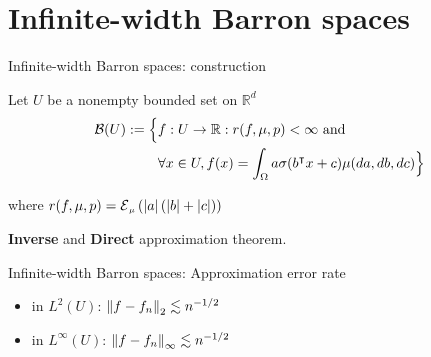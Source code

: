 \documentclass[aspectratio=32]{beamer}
\begin{document}
\section{Infinite-width Barron spaces}
\begin{frame}{Infinite-width Barron spaces: construction}

    Let $U$ be a nonempty bounded set on $\mathbb{R}^d$
    \begin{align*}
        \mathcal{B}(U) := \Big\{
         & f: U \to \mathbb{R}: r(f, \mu, p) < \infty  \textnormal{ and } \\
         & \forall x\in U,
        f(x) = \int_{\Omega} a \sigma(b{}^{\intercal} x + c) \mu(da, db, dc)
        \Big\}
    \end{align*}

    where $r(f, \mu, p) = \ERWi{\mu}{\abs{a} (\abs{b} + \abs{c})}$

    \vspace*{1em}

    \textbf{Inverse} and \textbf{Direct} approximation theorem.
\end{frame}

\begin{frame}{Infinite-width Barron spaces: Approximation error rate}
    \begin{itemize}
        \item in $L^{2}(U)$: $\left\| f - f_n \right\|_2 \lesssim n^{-1/2}$
        \item in $L^{\infty}(U)$: $\left\| f - f_n \right\|_{\infty} \lesssim n^{-1/2}$
    \end{itemize}


\end{frame}
\end{document}

